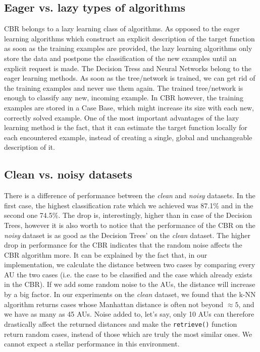 \documentclass[a4paper]{article}
\begin{document}
\subsection{Eager vs. lazy types of algorithms}

CBR belongs to a lazy learning class of algorithms. As opposed to the eager learning algorithms which construct an explicit description of the target function as soon as the training examples are provided, the lazy learning algorithms only store the data and postpone the classification of the new examples until an explicit request is made. The Decision Tress and Neural Networks belong to the eager learning methods. As soon as the tree/network is trained, we can get rid of the training examples and never use them again. The trained tree/network is enough to classify any new, incoming example. In CBR however, the training examples are stored in a Case Base, which might increase its size with each new, correctly solved example. One of the most important advantages of the lazy learning method is the fact, that it can estimate the target function locally for each encountered example, instead of creating a single, global and unchangeable description of it.

\subsection{Clean vs. noisy datasets}

There is a difference of performance between the \emph{clean} and \emph{noisy} datasets. In the first case, the highest classification rate which we achieved was 87.1\% and in the second one 74.5\%. The drop is, interestingly, higher than in case of the Decision Trees, however it is also worth to notice that the performance of the CBR on the \emph{noisy} dataset is as good as the Decision Trees' on the \emph{clean} dataset. The higher drop in performance for the CBR indicates that the random noise affects the CBR algorithm more. It can be explained by the fact that, in our implementation, we calculate the distance between two cases by comparing every AU the two cases (i.e. the case to be classified and the case which already exists in the CBR). If we add some random noise to the AUs, the distance will increase by a big factor. In our experiments on the \emph{clean} dataset, we found that the k-NN algorithm returns cases whose Manhattan distance is often not beyond $\approx5$, and we have as many as 45 AUs. Noise added to, let's say, only 10 AUs can therefore drastically affect the returned distances and make the \texttt{retrieve()} function return random cases, instead of those which are truly the most similar ones. We cannot expect a stellar performance in this environment.
\end{document}

